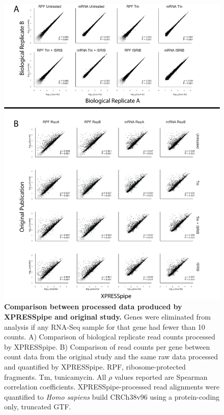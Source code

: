 \documentclass[10pt, oneside]{article}
\begin{document}
\begin{figure}
\centering
  \includegraphics[width=145mm]{figures/xpresspipe_figure2.png}
  \caption{\textbf{Comparison between processed data produced by XPRESSpipe and original study.} Genes were eliminated from analysis if any RNA-Seq sample for that gene had fewer than 10 counts. A) Comparison of biological replicate read counts processed by XPRESSpipe. B) Comparison of read counts per gene between count data from the original study and the same raw data processed and quantified by XPRESSpipe. RPF, ribosome-protected fragments. Tm, tunicamycin. All $\rho$ values reported are Spearman correlation coefficients. XPRESSpipe-processed read alignments were quantified to \textit{Homo sapiens} build CRCh38v96 using a protein-coding only, truncated GTF.}
  \label{fig:figure2}
\end{figure}
\end{document}

